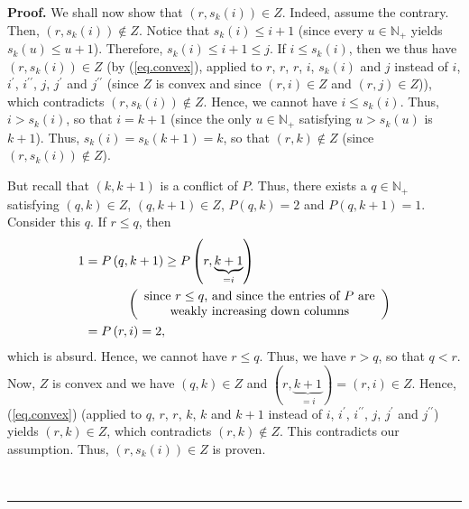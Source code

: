 \documentclass[numbers=enddot,12pt,final,onecolumn,notitlepage]{scrartcl}%
\theoremstyle{definition}
\newenvironment{proof}[1][Proof]{\noindent\textbf{#1.} }{\ \rule{0.5em}{0.5em}}
\begin{document}
\begin{proof}
We shall now show that $\left(  r,s_{k}\left(  i\right)  \right)  \in Z$.
Indeed, assume the contrary. Then, $\left(  r,s_{k}\left(  i\right)  \right)
\notin Z$. Notice that $s_{k}\left(  i\right)  \leq i+1$ (since every
$u\in\mathbb{N}_{+}$ yields $s_{k}\left(  u\right)  \leq u+1$). Therefore,
$s_{k}\left(  i\right)  \leq i+1\leq j$. If $i\leq s_{k}\left(  i\right)  $,
then we thus have $\left(  r,s_{k}\left(  i\right)  \right)  \in Z$ (by
(\ref{eq.convex}), applied to $r$, $r$, $r$, $i$, $s_{k}\left(  i\right)  $
and $j$ instead of $i$, $i^{\prime}$, $i^{\prime\prime}$, $j$, $j^{\prime}$
and $j^{\prime\prime}$ (since $Z$ is convex and since $\left(  r,i\right)  \in
Z$ and $\left(  r,j\right)  \in Z$)), which contradicts $\left(
r,s_{k}\left(  i\right)  \right)  \notin Z$. Hence, we cannot have $i\leq
s_{k}\left(  i\right)  $. Thus, $i>s_{k}\left(  i\right)  $, so that $i=k+1$
(since the only $u\in\mathbb{N}_{+}$ satisfying $u>s_{k}\left(  u\right)  $ is
$k+1$). Thus, $s_{k}\left(  i\right)  =s_{k}\left(  k+1\right)  =k$, so that
$\left(  r,k\right)  \notin Z$ (since $\left(  r,s_{k}\left(  i\right)
\right)  \notin Z$).

But recall that $\left(  k,k+1\right)  $ is a conflict of $P$. Thus, there
exists a $q\in\mathbb{N}_{+}$ satisfying $\left(  q,k\right)  \in Z$, $\left(
q,k+1\right)  \in Z$, $P\left(  q,k\right)  =2$ and $P\left(  q,k+1\right)
=1$. Consider this $q$. If $r\leq q$, then
\begin{align*}
1  &  =P\left(  q,k+1\right)  \geq P\left(  r,\underbrace{k+1}_{=i}\right) \\
&  \ \ \ \ \ \ \ \ \ \ \left(
\begin{array}
[c]{c}%
\text{since }r\leq q\text{, and since the entries of }P\text{ are}\\
\text{weakly increasing down columns}%
\end{array}
\right) \\
&  =P\left(  r,i\right)  =2,
\end{align*}
which is absurd. Hence, we cannot have $r\leq q$. Thus, we have $r>q$, so that
$q<r$. Now, $Z$ is convex and we have $\left(  q,k\right)  \in Z$ and $\left(
r,\underbrace{k+1}_{=i}\right)  =\left(  r,i\right)  \in Z$. Hence,
(\ref{eq.convex}) (applied to $q$, $r$, $r$, $k$, $k$ and $k+1$ instead of
$i$, $i^{\prime}$, $i^{\prime\prime}$, $j$, $j^{\prime}$ and $j^{\prime\prime
}$) yields $\left(  r,k\right)  \in Z$, which contradicts $\left(  r,k\right)
\notin Z$. This contradicts our assumption. Thus, $\left(  r,s_{k}\left(
i\right)  \right)  \in Z$ is proven.


\end{proof}
\end{document}
